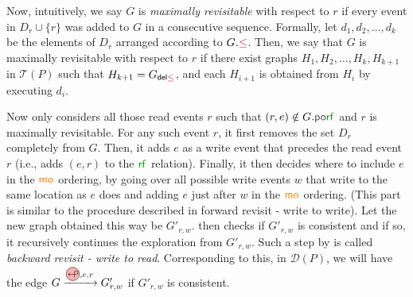 Now, intuitively, we say $G$ is \emph{maximally revisitable} with respect to $r$ if every event in 
$D_r \cup \{r\}$ was added to $G$ in a consecutive sequence. Formally, let $d_1,d_2,\dots,d_k$ be the elements of $D_r$ arranged according to $G.\textcolor{purple}\leq$. Then, we say that $G$ is maximally revisitable with respect to $r$ if there exist graphs $H_1,H_2,\dots,H_k,H_{k+1}$ in $\mathcal{T}(P)$ 
such that $H_{k+1} = G_{\textsf{del} \textcolor{purple}\leq}$, and each $H_{i+1}$ is obtained from $H_i$ by executing $d_i$.




Now \trust only considers all those read events $r$ such that $(r,e) \notin G.\porf{}$ and $r$ is maximally revisitable. For any such event $r$, it first removes the set $D_r$ completely from $G$.
Then, it adds $e$ as a write event that precedes the read event $r$ (i.e., adds $(e,r)$ to the $\rf{}$ relation). Finally, it then decides where to include $e$ in the ${\textcolor{orange}{\mathsf{mo}}_{}}$ ordering, by going over all possible write events $w$ that write to the same location as $e$ does and adding $e$ just after $w$ in the ${\textcolor{orange}{\mathsf{mo}}_{}}$ ordering. (This part is similar to the procedure described in forward revisit - write to write). Let the new graph obtained this way be $G'_{r,w}$. \trust then checks if $G'_{r,w}$ is consistent and if so, it recursively continues the exploration from $G'_{r,w}$.  Such a step by \trust is called \emph{backward revisit - write to read}. Corresponding to this, in $\mathcal{D}(P)$, we will have the edge $G \xrightarrow{\bwdtikz, e, r} G'_{r,w}$ if $G'_{r,w}$ is consistent.

